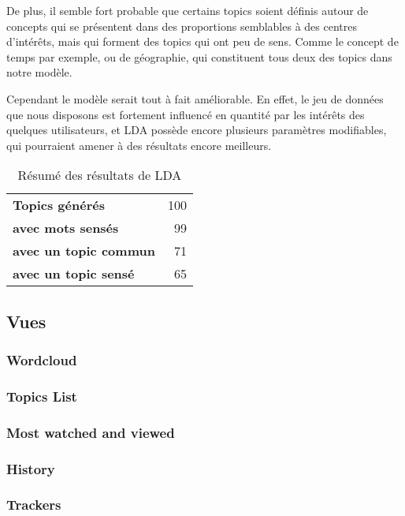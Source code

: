 				De plus, il semble fort probable que certains topics soient définis autour de concepts qui se présentent dans des proportions semblables à des centres d'intérêts, mais qui forment des topics qui ont peu de sens. Comme le concept de temps par exemple, ou de géographie, qui constituent tous deux des topics dans notre modèle.

				Cependant le modèle serait tout à fait améliorable. En effet, le jeu de données que nous disposons est fortement influencé en quantité par les intérêts des quelques utilisateurs, et LDA possède encore plusieurs paramètres modifiables, qui pourraient amener à des résultats encore meilleurs.

\FloatBarrier

				\begin{table}[h]
\centering
\caption{Résumé des résultats de LDA}
\label{resultats-lda}
\begin{tabular}{lr}
\textbf{Topics générés}            & 100 \\
\textbf{avec mots sensés}           & 99 \\
\textbf{avec un topic commun}       & 71 \\
\textbf{avec un topic sensé}        & 65 \\
\end{tabular}
\end{table}

	\subsection{Vues}

		\subsubsection{Wordcloud}

		\subsubsection{Topics List}

		\subsubsection{Most watched and viewed}

		\subsubsection{History}

		\subsubsection{Trackers}

